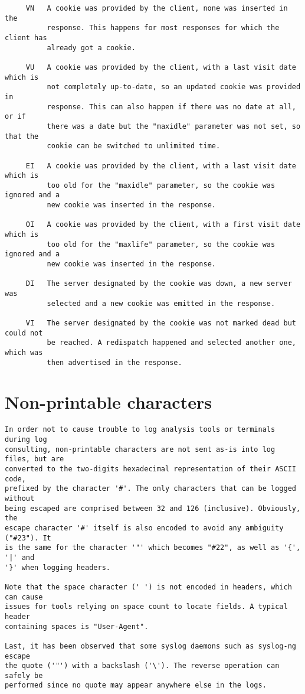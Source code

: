 \begin{verbatim}
     VN   A cookie was provided by the client, none was inserted in the
          response. This happens for most responses for which the client has
          already got a cookie.

     VU   A cookie was provided by the client, with a last visit date which is
          not completely up-to-date, so an updated cookie was provided in
          response. This can also happen if there was no date at all, or if
          there was a date but the "maxidle" parameter was not set, so that the
          cookie can be switched to unlimited time.

     EI   A cookie was provided by the client, with a last visit date which is
          too old for the "maxidle" parameter, so the cookie was ignored and a
          new cookie was inserted in the response.

     OI   A cookie was provided by the client, with a first visit date which is
          too old for the "maxlife" parameter, so the cookie was ignored and a
          new cookie was inserted in the response.

     DI   The server designated by the cookie was down, a new server was
          selected and a new cookie was emitted in the response.

     VI   The server designated by the cookie was not marked dead but could not
          be reached. A redispatch happened and selected another one, which was
          then advertised in the response.
\end{verbatim}

\section{Non-printable characters}

\begin{verbatim}
In order not to cause trouble to log analysis tools or terminals during log
consulting, non-printable characters are not sent as-is into log files, but are
converted to the two-digits hexadecimal representation of their ASCII code,
prefixed by the character '#'. The only characters that can be logged without
being escaped are comprised between 32 and 126 (inclusive). Obviously, the
escape character '#' itself is also encoded to avoid any ambiguity ("#23"). It
is the same for the character '"' which becomes "#22", as well as '{', '|' and
'}' when logging headers.

Note that the space character (' ') is not encoded in headers, which can cause
issues for tools relying on space count to locate fields. A typical header
containing spaces is "User-Agent".

Last, it has been observed that some syslog daemons such as syslog-ng escape
the quote ('"') with a backslash ('\'). The reverse operation can safely be
performed since no quote may appear anywhere else in the logs.
\end{verbatim}

